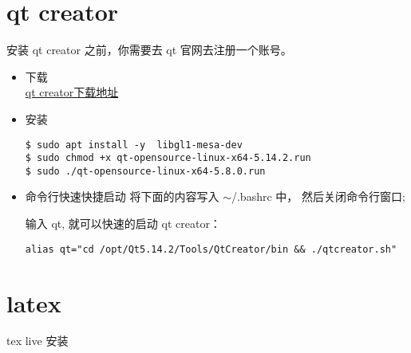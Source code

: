 \section{qt creator}
安装 qt creator 之前，你需要去 qt 官网去注册一个账号。
\begin{itemize}
\item 下载 \\
\href{https://mirrors.tuna.tsinghua.edu.cn/qt/official_releases/qt/5.14/5.14.2/qt-opensource-linux-x64-5.14.2.run}{qt creator下载地址}

\item 安装
\begin{lstlisting}
$ sudo apt install -y  libgl1-mesa-dev
$ sudo chmod +x qt-opensource-linux-x64-5.14.2.run
$ sudo ./qt-opensource-linux-x64-5.8.0.run 
\end{lstlisting}

\item 命令行快速快捷启动
将下面的内容写入 $ \sim $/.bashrc 中， 然后关闭命令行窗口;

输入 qt, 就可以快速的启动 qt creator：
\begin{lstlisting}
alias qt="cd /opt/Qt5.14.2/Tools/QtCreator/bin && ./qtcreator.sh"
\end{lstlisting}

%
\end{itemize}
\newpage

\section{latex}
tex live 安装 \\

